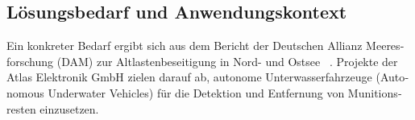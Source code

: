 \begin{otherlanguage}{ngerman}
\section{Lösungsbedarf und Anwendungskontext}

Ein konkreter Bedarf ergibt sich aus dem Bericht der Deutschen Allianz Meeresforschung (DAM) zur Altlastenbeseitigung in Nord- und Ostsee ~\parencite{dam2024}. Projekte der Atlas Elektronik GmbH zielen darauf ab, autonome Unterwasserfahrzeuge (\gls{Autonomous Underwater Vehicle}s) für die Detektion und Entfernung von Munitionsresten einzusetzen. 
\end{otherlanguage}
